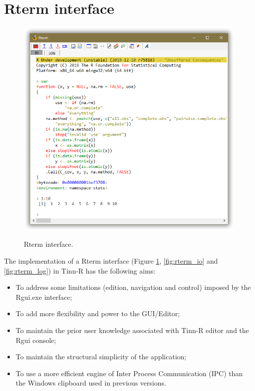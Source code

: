 
\hypertarget{working_rterm}{}
\section{Rterm interface}

\begin{figure}[H]
  \includegraphics[scale=0.35]{./res/rterm.png}\\
  \caption{Rterm interface.}
  \label{fig:rterm_interface}
\end{figure}

The implementation of a Rterm interface
(Figure \ref{fig:rterm_interface},
\ref{fig:rterm_io} and
\ref{fig:rterm_log})
in Tinn-R has the following aims:
\begin{itemize}
  \item To address some limitations (edition, navigation and control) imposed by the Rgui.exe interface;
  \item To add more flexibility and power to the GUI/Editor;
  \item To maintain the prior user knowledge associated with Tinn-R editor and the Rgui console;
  \item To maintain the structural simplicity of the application;
  \item To use a more efficient engine of Inter Process Communication (IPC)
    than the Windows clipboard used in previous versions.
\end{itemize}

